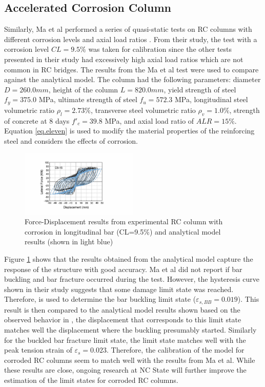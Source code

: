 \subsection{Accelerated Corrosion Column}
Similarly, Ma et al performed a series of quasi-static tests on RC columns with different corrosion levels and axial load ratios \cite{Ma2012}. From their study, the test with a corrosion level $CL=9.5\%$ was taken for calibration since the other tests presented in their study had excessively high axial load ratios which are not common in RC bridges. The results from the Ma et al test \cite{Ma2012} were used to compare against the analytical model. The column had the following parameters: diameter $D = 260.0 mm$, height of the column $L = 820.0 mm$, yield strength of steel $f_{y} = 375.0$ MPa, ultimate strength of steel $f_{u} = 572.3$ MPa, longitudinal steel volumetric ratio $\rho_{l} = 2.73\% $, transverse steel volumetric ratio $\rho_{v} = 1.0\% $, strength of concrete at 8 days $f'_{c} = 39.8$ MPa, and axial load ratio of $ALR=15\%$. Equation \ref{eq.eleven} is used to modify the material properties of the reinforcing steel and considers the effects of corrosion. 

\begin{figure}[htbp]
	\centering
	\includegraphics[width=0.50\textwidth]{Chapter-5/figs/Model_vs_MaEtAl_220218.pdf}
	\caption{Force-Displacement results from experimental RC column with corrosion in longitudinal bar (CL=9.5\%) \cite{Ma2012} and analytical model results (shown in light blue)}
	\label{fig:ModelCalibration_Corrosion}
\end{figure}

Figure \ref{fig:ModelCalibration_Corrosion} shows that the results obtained from the analytical model capture the response of the structure with good accuracy. Ma et al \cite{Ma2012} did not report if bar buckling and bar fracture occurred during the test. However, the hysteresis curve shown in their study suggests that some damage limit state was reached. Therefore,  is used to determine the bar buckling limit state ($\varepsilon_{s,BB}=0.019$). This result is then compared to the analytical model results shown  based on the observed behavior in , the displacement that corresponds to this limit state matches well the displacement where the buckling presumably started. Similarly for the buckled bar fracture limit state, the limit state matches well with the peak tension strain of $\varepsilon_{s}=0.023$. Therefore, the calibration of the model for corroded RC columns seem to match well with the results from Ma et al. While these results are close, ongoing research at NC State will further improve the estimation of the limit states for corroded RC columns.

